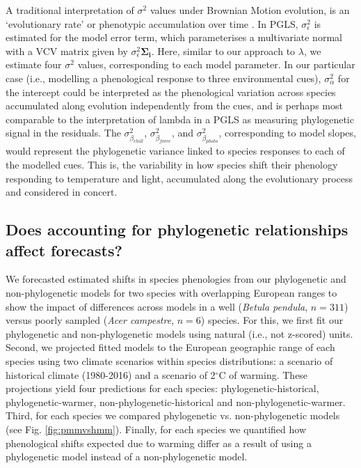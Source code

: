 \documentclass[11pt]{article}
\begin{document}
A traditional interpretation of $\sigma^2$ values under Brownian Motion evolution, is an `evolutionary rate' or phenotypic accumulation over time \citep{revell2008phylogenetic}. In PGLS, $\sigma_\epsilon^2$ is estimated for the model error term, which parameterises a multivariate normal with a VCV matrix given by $\sigma_\epsilon^2$$\boldsymbol{\Sigma_i}$. Here, similar to our approach to $\lambda$, we estimate four $\sigma^2$ values, corresponding to each model parameter. In our particular case (i.e., modelling a phenological response to three environmental cues), $\sigma_\alpha^2$ for the intercept could be interpreted as the phenological variation across species accumulated along evolution independently from the cues, and is perhaps most comparable to the interpretation of lambda in a PGLS as measuring phylogenetic signal in the residuals. The $\sigma_{\beta_{chill}}^2$, $\sigma_{\beta_{force}}^2$, and $\sigma_{\beta_{photo}}^2$, corresponding to model slopes, would represent the phylogenetic variance linked to species responses to each of the modelled cues. This is, the variability in how species shift their phenology responding to temperature and light, accumulated along the evolutionary process and considered in concert. 

\subsection*{Does accounting for phylogenetic relationships affect forecasts?}
We forecasted estimated shifts in species phenologies from our phylogenetic and non-phylogenetic models for two species with overlapping European ranges to show the impact of differences across models in a well (\emph{Betula pendula}, $n=311$) versus poorly sampled  (\emph{Acer campestre}, $n=6$) species. For this, we first fit our phylogenetic and non-phylogenetic models using natural (i.e., not z-scored) units. Second, we projected fitted models to the European geographic range of each species using two climate scenarios within species distributions: a scenario of historical climate (1980-2016) and a scenario of 2$^{\circ}$C of warming. These projections yield four predictions for each species: phylogenetic-historical, phylogenetic-warmer, non-phylogenetic-historical and non-phylogenetic-warmer. Third, for each species we compared phylogenetic vs. non-phylogenetic models (see Fig. \ref{fig:pmmvshmm}). Finally, for each species we quantified how phenological shifts expected due to warming differ as a result of using a phylogenetic model instead of a non-phylogenetic model.  
\end{document}
